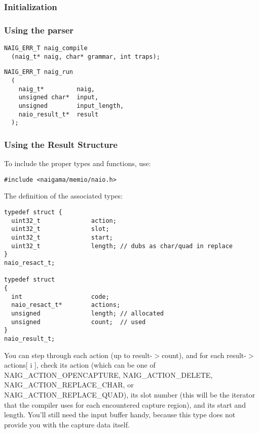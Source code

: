 \subsubsection{Initialization}

\subsubsection{Using the parser}

\begin{myquote}
\begin{verbatim}
NAIG_ERR_T naig_compile
  (naig_t* naig, char* grammar, int traps);
\end{verbatim}
\end{myquote}

\begin{myquote}
\begin{verbatim}
NAIG_ERR_T naig_run
  (
    naig_t*         naig,
    unsigned char*  input,
    unsigned        input_length,
    naio_result_t*  result
  );
\end{verbatim}
\end{myquote}

\subsubsection{Using the Result Structure}

To include the proper types and functions, use:

\begin{myquote}
\begin{verbatim}
#include <naigama/memio/naio.h>
\end{verbatim}
\end{myquote}

The definition of the associated types:

\begin{myquote}
\begin{verbatim}
typedef struct {
  uint32_t              action;
  uint32_t              slot;
  uint32_t              start;
  uint32_t              length; // dubs as char/quad in replace
}
naio_resact_t;

typedef struct
{
  int                   code;
  naio_resact_t*        actions;
  unsigned              length; // allocated
  unsigned              count;  // used
}
naio_result_t;
\end{verbatim}
\end{myquote}

You can step through each action (up to result-$>$count),
and for each result-$>$actions[ i ], check its action
(which can be one of NAIG\_ACTION\_OPENCAPTURE,
NAIG\_ACTION\_DELETE, NAIG\_ACTION\_REPLACE\_CHAR, or
NAIG\_ACTION\_REPLACE\_QUAD),
its slot number (this will be the iterator that the compiler uses
for each encountered capture region), and its start and length.
You'll still need the input buffer handy, because this type does
not provide you with the capture data itself.

